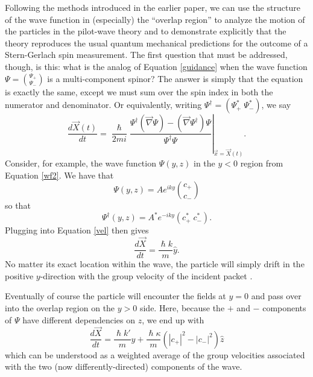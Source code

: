 \documentclass[aps,prc,onecolumn,letterpaper,floatfix,12pt]{revtex4}
\renewcommand{\hbar}{\hslash}
\begin{document}
Following the methods introduced in the earlier paper, we can use the
structure of the wave function in (especially) the ``overlap region'' to analyze
the motion of the particles in the pilot-wave theory and to
demonstrate explicitly that the theory reproduces the usual quantum
mechanical predictions for the outcome of a Stern-Gerlach spin
measurement.  The first question that must be addressed, though, is
this:  what is the analog of Equation \eqref{guidance} when the wave
function $\Psi = \binom{\Psi_+}{\Psi_-}$ is a multi-component spinor?
The answer is simply that the equation is exactly the same, except we
must sum over the spin index in both the numerator and denominator.
Or equivalently, writing $\Psi^\dagger = (\Psi^*_+ \; \Psi^*_-)$, we say
\begin{equation}
\frac{d \vec{X}(t)}{dt} = \left. \frac{\hbar}{2mi} \frac{ \Psi^\dagger
\left(  \vec{\nabla} \Psi \right) - \left( \vec{\nabla} \Psi^\dagger
\right) \Psi}{\Psi^\dagger \Psi} \right|_{\vec{x} = \vec{X}(t)} .
\label{vel}
\end{equation}
Consider, for example, the wave function $\Psi(y,z)$ in the $y<0$
region from Equation \eqref{wf2}.  We have that 
\begin{equation}
\Psi(y,z) = A e^{iky} \binom{c_+}{c_-}
\end{equation}
so that 
\begin{equation}
\Psi^\dagger (y,z) = A^* e^{-i k y} (c^*_+ \; c^*_-).
\end{equation}
Plugging into Equation \eqref{vel} then gives 
\begin{equation}
\frac{d\vec{X}}{dt} = \frac{\hbar k}{m} \hat{y}.
\end{equation}
No matter its exact location within the wave, the particle will simply 
drift in the positive $y$-direction with the group velocity of the
incident packet \cite{reflectedwave}.  

Eventually of course the particle will encounter the fields at
$y=0$ and pass over into the overlap region on the $y>0$ side. Here,
because the $+$ and $-$ components of $\Psi$ have different
dependencies on $z$, we end up with
\begin{equation}
\frac{d \vec{X}}{dt} = \frac{\hbar k'}{m} \hat{y} + \frac{\hbar
  \kappa}{m} \left( |c_+|^2 - |c_-|^2\right) \hat{z}
\label{overlapvel}
\end{equation}
which can be understood as a weighted average of the group velocities
associated with the two (now differently-directed) components of the
wave.  
\end{document}
